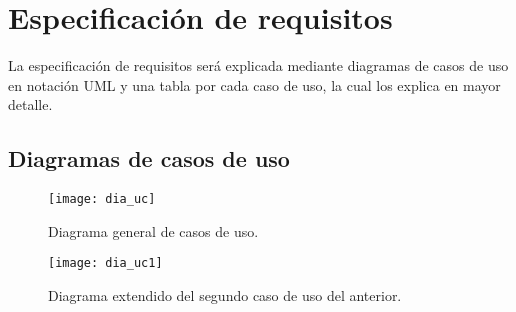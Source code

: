 \section{Especificación de requisitos}

La especificación de requisitos será explicada mediante diagramas de casos de uso en notación UML y una tabla por cada caso de uso, la cual los explica en mayor detalle.

\subsection{Diagramas de casos de uso}

\begin{figure}
\centering
\texttt{[image: dia\_uc]}
\caption{Diagrama general de casos de uso.}
\label{fig:B.1}
\end{figure}

\begin{figure}
\centering
\texttt{[image: dia\_uc1]}
\caption[Diagrama extendido]{Diagrama extendido del segundo caso de uso del anterior.}
\label{fig:B.2}
\end{figure}




